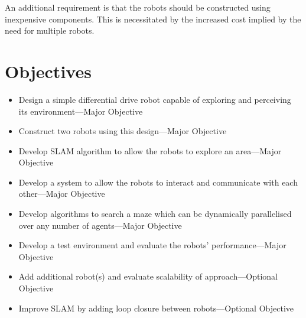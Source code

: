 An additional requirement is that the robots should be constructed using
inexpensive components. This is necessitated by the increased cost implied
by the need for multiple robots.

\section{Objectives}\label{introduction/objectives}
\begin{itemize}
\item{Design a simple differential drive robot capable of exploring and perceiving its environment---Major Objective}
    \item{Construct two robots using this design---Major Objective}
    \item{Develop SLAM algorithm to allow the robots to explore an area---Major Objective}
    \item{Develop a system to allow the robots to interact and communicate with each other---Major Objective}
    \item{Develop algorithms to search a maze which can be dynamically parallelised over any number of agents---Major Objective}
    \item{Develop a test environment and evaluate the robots’ performance---Major Objective}
    \item{Add additional robot(s) and evaluate scalability of approach---Optional Objective}
    \item{Improve SLAM by adding loop closure between robots---Optional Objective}
\end{itemize}